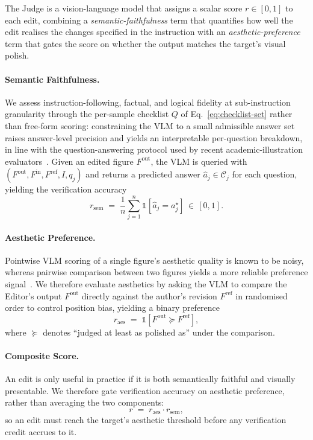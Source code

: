 \documentclass[11pt]{article}
\begin{document}
The Judge is a vision-language model that assigns a scalar score
$r\!\in\![0,1]$ to each edit, combining a
\emph{semantic-faithfulness} term that quantifies how well the
edit realises the changes specified in the instruction with an
\emph{aesthetic-preference} term that gates the score on whether
the output matches the target's visual polish.

\paragraph{Semantic Faithfulness.}
We assess instruction-following, factual, and logical fidelity at
sub-instruction granularity through the per-sample checklist $Q$
of Eq.~\ref{eq:checklist-set} rather than free-form scoring:
constraining the VLM to a small admissible answer set raises
answer-level precision and yields an interpretable per-question
breakdown, in line with the question-answering protocol used by
recent academic-illustration
evaluators~\citep{liao2026aibench}.  Given an edited figure
$F^{\mathrm{out}}$, the VLM is queried with
$(F^{\mathrm{out}}, F^{\mathrm{in}}, F^{\mathrm{ref}}, I, q_j)$
and returns a predicted answer
$\hat{a}_j\!\in\!\mathcal{C}_j$ for each question, yielding the
verification accuracy
\begin{equation}
\label{eq:checklist-pass}
r_{\mathrm{sem}} \;=\; \frac{1}{n}\sum_{j=1}^{n}\mathbb{1}\!\left[\hat{a}_j = a^{\star}_j\right] \,\in\,[0,1].
\end{equation}

\paragraph{Aesthetic Preference.}
Pointwise VLM scoring of a single figure's aesthetic quality is
known to be noisy, whereas pairwise comparison between two
figures yields a more reliable preference
signal~\citep{wang2025pref}.  We therefore evaluate
aesthetics by asking the VLM to compare the Editor's output
$F^{\mathrm{out}}$ directly against the author's revision
$F^{\mathrm{ref}}$ in randomised order to control position bias,
yielding a binary preference
\begin{equation}
\label{eq:aesthetic-gate}
r_{\mathrm{aes}} \;=\; \mathbb{1}\!\left[F^{\mathrm{out}} \succeq F^{\mathrm{ref}}\right],
\end{equation}
where $\succeq$ denotes ``judged at least as polished as'' under
the comparison.

\paragraph{Composite Score.}
An edit is only useful in practice if it is both semantically
faithful and visually presentable.  We therefore gate verification
accuracy on aesthetic preference, rather than averaging the two
components:
\begin{equation}
\label{eq:reward}
r \;=\; r_{\mathrm{aes}} \cdot r_{\mathrm{sem}},
\end{equation}
so an edit must reach the target's aesthetic threshold before any
verification credit accrues to it.
\end{document}
